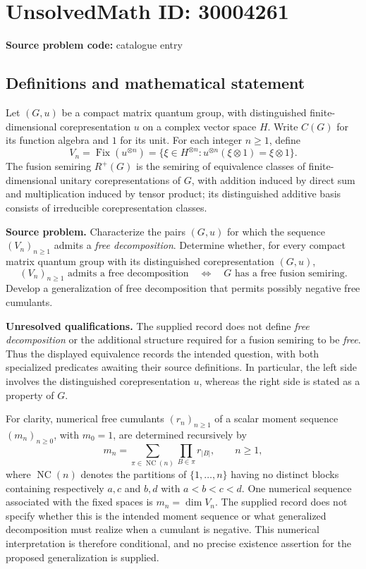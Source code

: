 \documentclass[11pt]{article}
\begin{document}
\section*{UnsolvedMath ID: 30004261}
\textbf{Source problem code:} catalogue entry
\subsection{Definitions and mathematical statement}
Let \((G,u)\) be a compact matrix quantum group, with distinguished finite-dimensional corepresentation \(u\) on a complex vector space \(H\). Write \(C(G)\) for its function algebra and \(1\) for its unit. For each integer \(n\geq 1\), define
\[
V_n=\operatorname{Fix}(u^{\otimes n})=\{\xi\in H^{\otimes n}:u^{\otimes n}(\xi\otimes 1)=\xi\otimes 1\}.
\]
The fusion semiring \(R^+(G)\) is the semiring of equivalence classes of finite-dimensional unitary corepresentations of \(G\), with addition induced by direct sum and multiplication induced by tensor product; its distinguished additive basis consists of irreducible corepresentation classes.

\textbf{Source problem.} Characterize the pairs \((G,u)\) for which the sequence \((V_n)_{n\geq 1}\) admits a \emph{free decomposition}. Determine whether, for every compact matrix quantum group with its distinguished corepresentation \((G,u)\),
\[
(V_n)_{n\geq 1}\text{ admits a free decomposition}
\quad\Longleftrightarrow\quad
G\text{ has a free fusion semiring}.
\]
Develop a generalization of free decomposition that permits possibly negative free cumulants.

\textbf{Unresolved qualifications.} The supplied record does not define \emph{free decomposition} or the additional structure required for a fusion semiring to be \emph{free}. Thus the displayed equivalence records the intended question, with both specialized predicates awaiting their source definitions. In particular, the left side involves the distinguished corepresentation \(u\), whereas the right side is stated as a property of \(G\).

For clarity, numerical free cumulants \((r_n)_{n\geq 1}\) of a scalar moment sequence \((m_n)_{n\geq 0}\), with \(m_0=1\), are determined recursively by
\[
m_n=\sum_{\pi\in\operatorname{NC}(n)}\prod_{B\in\pi}r_{|B|},\qquad n\geq 1,
\]
where \(\operatorname{NC}(n)\) denotes the partitions of \(\{1,\ldots,n\}\) having no distinct blocks containing respectively \(a,c\) and \(b,d\) with \(a<b<c<d\). One numerical sequence associated with the fixed spaces is \(m_n=\dim V_n\). The supplied record does not specify whether this is the intended moment sequence or what generalized decomposition must realize when a cumulant is negative. This numerical interpretation is therefore conditional, and no precise existence assertion for the proposed generalization is supplied.
\end{document}
